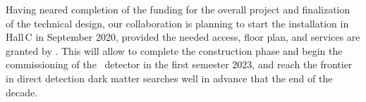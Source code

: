 Having neared completion of the funding for the overall project and finalization of the technical design, our collaboration is planning to start the installation in  Hall\,C in September 2020, provided the needed access, floor plan, and services are granted by \LNGS.  This will allow  to complete the construction phase and begin the commissioning of the \DSks\ detector in the first semester 2023, and reach the frontier in direct detection dark matter searches well in advance that the end of the decade.

